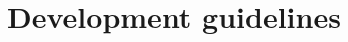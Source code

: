 \documentclass{article}
\begin{document}
\title{Development guidelines}
\maketitle
\tableofcontents

\pagebreak





\end{document}
